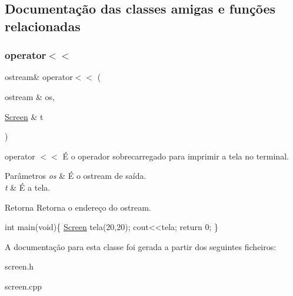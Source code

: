 \subsection{Documentação das classes amigas e funções relacionadas}
\mbox{\label{class_screen_aab6a2880746bfe1b7964817cc8f0989e}} 
\subsubsection{\texorpdfstring{operator$<$$<$}{operator<<}}
{\footnotesize\ttfamily ostream\& operator$<$$<$ (\begin{DoxyParamCaption}\item[{ostream \&}]{os,  }\item[{\mbox{\hyperlink{class_screen}{Screen}} \&}]{t }\end{DoxyParamCaption})\hspace{0.3cm}{\ttfamily [friend]}}



operator $<$$<$ É o operador sobrecarregado para imprimir a tela no terminal. 


\begin{DoxyParams}{Parâmetros}
{\em os} & É o ostream de saída. \\
\hline
{\em t} & É a tela. \\
\hline
\end{DoxyParams}
\begin{DoxyReturn}{Retorna}
Retorna o endereço do ostream. 
\begin{DoxyPre}
int main(void)\{
   \mbox{\hyperlink{class_screen}{Screen}} tela(20,20);
   cout<<tela;
   return 0;
\}
\end{DoxyPre}
 
\end{DoxyReturn}


A documentação para esta classe foi gerada a partir dos seguintes ficheiros\+:\begin{DoxyCompactItemize}
\item 
screen.\+h\item 
screen.\+cpp\end{DoxyCompactItemize}
